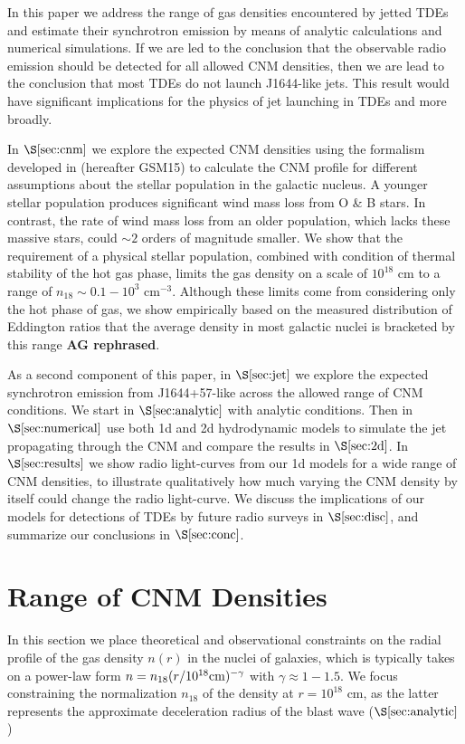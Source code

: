 \documentclass[usenatbib,fleqn]{mnras}
\begin{document}
In this paper we address the range of gas densities encountered by
jetted TDEs and estimate their synchrotron emission by means of
analytic calculations and numerical simulations.  If we are led to the
conclusion that the observable radio emission should be detected for
all allowed CNM densities, then we are lead to the conclusion that
most TDEs do not launch J1644-like jets.  This result would have
significant implications for the physics of jet launching in TDEs and
more broadly.

In $\S\ref{sec:cnm}$ we explore the expected CNM densities using the
formalism developed in \citet{Generozov+2015} (hereafter GSM15) to
calculate the CNM profile for different assumptions about the stellar
population in the galactic nucleus.  A younger stellar population
produces significant wind mass loss from O \& B stars. In contrast,
the rate of wind mass loss from an older population, which lacks these
massive stars, could $\sim 2$ orders of magnitude smaller.  We show
that the requirement of a physical stellar population, combined with
condition of thermal stability of the hot gas phase, limits the gas
density on a scale of $10^{18}$ cm to a range of $n_{18} \sim
0.1-10^{3}$ cm$^{-3}$.  Although these limits come from considering
only the hot phase of gas, we show empirically based on the measured
distribution of Eddington ratios that the average density in most
galactic nuclei is bracketed by this range {\bf AG rephrased}.

As a second component of this paper, in $\S\ref{sec:jet}$ we
explore the expected synchrotron emission from J1644+57-like across
the allowed range of CNM conditions.  We start in
$\S\ref{sec:analytic}$ with analytic conditions.  Then in
$\S\ref{sec:numerical}$ use both 1d and 2d hydrodynamic models to
simulate the jet propagating through the CNM and compare the results
in $\S\ref{sec:2d}$. In $\S\ref{sec:results}$ we show radio
light-curves from our 1d models for a wide range of CNM densities, to
illustrate qualitatively how much varying the CNM density by itself
could change the radio light-curve.  We discuss the implications of
our models for detections of TDEs by future radio surveys in
$\S\ref{sec:disc}$, and summarize our conclusions in
$\S\ref{sec:conc}$.

\section{Range of CNM Densities}
\label{sec:cnm}

In this section we place theoretical and observational constraints on
the radial profile of the gas density $n(r)$ in the nuclei of
galaxies, which is typically takes on a power-law form $n =
n_{18}(r/10^{18}{\rm cm})^{-\gamma}$ with $\gamma \approx 1-1.5$.  We
focus constraining the normalization $n_{18}$ of the density at $r =
10^{18}$ cm, as the latter represents the approximate deceleration
radius of the blast wave ($\S\ref{sec:analytic}$)
\end{document}
